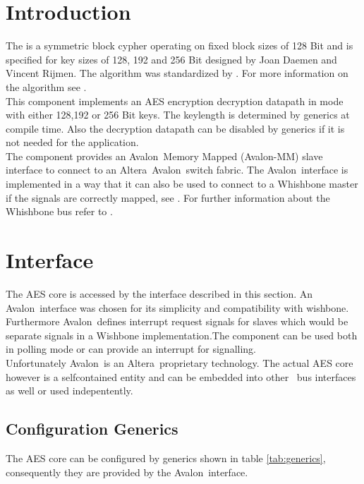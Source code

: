 \documentclass{ruschidoc}
\begin{document}
\maketitle

\newpage
\tableofcontents
\newpage

\section{Introduction}
\label{sec:intro} The \AES is a symmetric block cypher operating on fixed block sizes
of 128 Bit and is specified for key sizes of 128, 192 and 256 Bit designed by Joan
Daemen and Vincent Rijmen. The algorithm was standardized by \NIST. For more
information on the algorithm see \cite{NIST:Fips197}.\\
This component implements an AES encryption decryption datapath in \ECB mode with
either 128,192 or 256 Bit keys.  The keylength is determined by generics at compile
time. Also the decryption datapath can be disabled by generics if it is not needed
for the application.\\
The component provides an Avalon\rtm\ Memory Mapped (Avalon-MM) slave interface to
connect to an Altera\rtm\ Avalon\rtm\ switch fabric. The Avalon\rtm\ interface is
implemented in a way that it can also be used to connect to a Whishbone master if the
signals are correctly mapped, see \cite{Wiki:AvWb}. For further information about the 
Whishbone bus refer to \cite{OC:WBspec}. \\

\section{Interface}
\label{sec:interface}
The AES core is accessed by the interface described in this section. An Avalon\rtm\
interface was chosen for its simplicity and compatibility with wishbone.  Furthermore
Avalon\rtm\ defines interrupt request signals for slaves which would be separate
signals in a Wishbone implementation.The component can be used both in polling 
mode or can provide an interrupt for signalling. \\
Unfortunately Avalon\rtm\ is an Altera\rtm\ proprietary technology. The actual AES
core however is a selfcontained entity and can be embedded into other \SoC\ bus
interfaces as well or used indepentently.

\subsection{Configuration Generics}
\label{sec:generics}
The AES core can be configured by generics shown in table \ref{tab:generics},
consequently they are provided by the Avalon\rtm\ interface.
\end{document}
